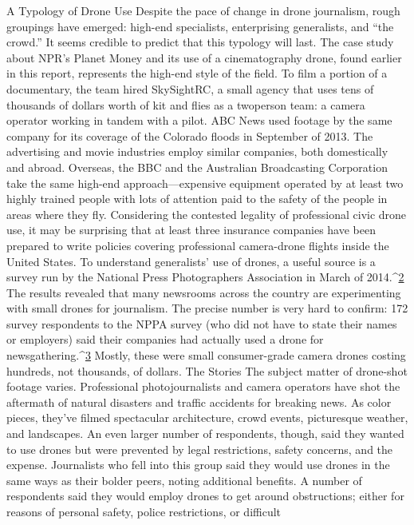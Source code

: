 A Typology of Drone Use
Despite the pace of change in drone journalism, rough groupings have
emerged: high-end specialists, enterprising generalists, and ``the crowd.'' It
seems credible to predict that this typology will last.
The case study about NPR's Planet Money and its use of a cinematography
drone, found earlier in this report, represents the high-end style of the field.
To film a portion of a documentary, the team hired SkySightRC, a small
agency that uses tens of thousands of dollars worth of kit and flies as a twoperson
team: a camera operator working in tandem with a pilot. ABC News
used footage by the same company for its coverage of the Colorado floods
in September of 2013. The advertising and movie industries employ similar
companies, both domestically and abroad. Overseas, the BBC and the Australian
Broadcasting Corporation take the same high-end approach—expensive
equipment operated by at least two highly trained people with lots of
attention paid to the safety of the people in areas where they fly. Considering
the contested legality of professional civic drone use, it may be surprising
that at least three insurance companies have been prepared to write policies
covering professional camera-drone flights inside the United States.
To understand generalists' use of drones, a useful source is a survey run by
the National Press Photographers Association in March of 2014.^{\href{#endnotes-industry-overview}{2}} The results
revealed that many newsrooms across the country are experimenting with
small drones for journalism. The precise number is very hard to confirm:
172 survey respondents to the NPPA survey (who did not have to state their names or employers) said their companies had actually used a drone for
newsgathering.^{\href{#endnotes-industry-overview}{3}} Mostly, these were small consumer-grade camera drones
costing hundreds, not thousands, of dollars.
The Stories
The subject matter of drone-shot footage varies. Professional photojournalists
and camera operators have shot the aftermath of natural disasters and
traffic accidents for breaking news. As color pieces, they've filmed spectacular
architecture, crowd events, picturesque weather, and landscapes.
An even larger number of respondents, though, said they wanted to use
drones but were prevented by legal restrictions, safety concerns, and the
expense. Journalists who fell into this group said they would use drones in
the same ways as their bolder peers, noting additional benefits.
A number of respondents said they would employ drones to get around
obstructions; either for reasons of personal safety, police restrictions, or difficult
